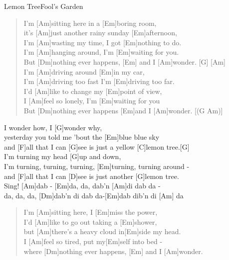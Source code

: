 \begin{song}{Lemon Tree}{Fool's Garden}

    \begin{verse}  
        I'm [Am]sitting here in a [Em]boring room, \\
        it's [Am]just another rainy sunday [Em]afternoon, \\
        I'm [Am]wasting my time, I got [Em]nothing to do. \\
        I'm [Am]hanging around, I'm [Em]waiting for you. \\
        But [Dm]nothing ever happens, [Em] and I [Am]wonder.  [G]  [Am] \\
        I'm [Am]driving around [Em]in my car, \\
        I'm [Am]driving too fast I'm [Em]driving too far.\\
        I'd [Am]like to change my [Em]point of view, \\
        I [Am]feel so lonely, I'm [Em]waiting for you \\
        But [Dm]nothing ever happens [Em]and I [Am]wonder. [(G Am)] \\
    \end{verse}  

    \begin{chorus}
        [C]I wonder how, I [G]wonder why, \\
        [Am]yesterday you told me 'bout the [Em]blue blue sky \\
        and [F]all that I can [G]see is just a yellow [C]lemon tree.[G] \\
        [C]I'm turning my head [G]up and down, \\
        [Am]I'm turning, turning, turning, [Em]turning, turning around - \\
        and [F]all that I can [D]see is just another [G]lemon tree. \\
        Sing! [Am]dab - [Em]da, da, dab'n [Am]di dab da - \\
        [Em]da, da, da, [Dm]dab'n di dab da-[Em]dab dib'n di [Am] da \\
    \end{chorus}

    \begin{verse}  
        I'm [Am]sitting here, I [Em]miss the power, \\
        I'd [Am]like to go out taking a [Em]shower, \\
        but [Am]there's a heavy cloud in[Em]side my head. \\
        I [Am]feel so tired, put my[Em]self into bed - \\
        where [Dm]nothing ever happens, [Em] and I [Am]wonder. \\
    \end{verse}  


\end{song}
